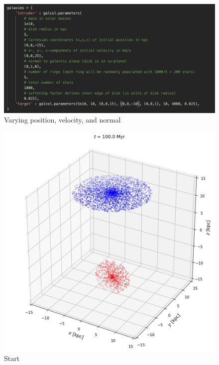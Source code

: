 \documentclass[linenumbers,RNAAS,trackchanges]{aastex631}
\begin{document}
\begin{figure}[H]
    \centering
    \includegraphics[scale=.60]{comparison_galaxy/ARP_10_vars.png}
    \caption{Varying position, velocity, and normal}
    \label{fig:code}
\end{figure}
\newpage
\begin{figure}[H]
    \centering
    \includegraphics[scale=.40]{comparison_galaxy/ARP_10_input.png}
    \caption{Start}
    \label{fig:code}
\end{figure}
\end{document}
